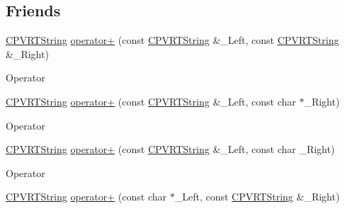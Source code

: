 \subsection*{Friends}
\begin{DoxyCompactItemize}
\item 
\hyperlink{class_c_p_v_r_t_string}{C\+P\+V\+R\+T\+String} \hyperlink{class_c_p_v_r_t_string_a55822216138f6b1754a86f5be8b2d3c1}{operator+} (const \hyperlink{class_c_p_v_r_t_string}{C\+P\+V\+R\+T\+String} \&\+\_\+\+Left, const \hyperlink{class_c_p_v_r_t_string}{C\+P\+V\+R\+T\+String} \&\+\_\+\+Right)
\begin{DoxyCompactList}\small\item\em 
\begin{DoxyItemize}
\item Operator 
\end{DoxyItemize}\end{DoxyCompactList}\item 
\hyperlink{class_c_p_v_r_t_string}{C\+P\+V\+R\+T\+String} \hyperlink{class_c_p_v_r_t_string_a9f4a0eae70b0814e1e7da15f10a793b9}{operator+} (const \hyperlink{class_c_p_v_r_t_string}{C\+P\+V\+R\+T\+String} \&\+\_\+\+Left, const char $\ast$\+\_\+\+Right)
\begin{DoxyCompactList}\small\item\em 
\begin{DoxyItemize}
\item Operator 
\end{DoxyItemize}\end{DoxyCompactList}\item 
\hyperlink{class_c_p_v_r_t_string}{C\+P\+V\+R\+T\+String} \hyperlink{class_c_p_v_r_t_string_abd3296911823f295efe289da8f3ded23}{operator+} (const \hyperlink{class_c_p_v_r_t_string}{C\+P\+V\+R\+T\+String} \&\+\_\+\+Left, const char \+\_\+\+Right)
\begin{DoxyCompactList}\small\item\em 
\begin{DoxyItemize}
\item Operator 
\end{DoxyItemize}\end{DoxyCompactList}\item 
\hyperlink{class_c_p_v_r_t_string}{C\+P\+V\+R\+T\+String} \hyperlink{class_c_p_v_r_t_string_a4ec418661812913ea5de1c1eac277bae}{operator+} (const char $\ast$\+\_\+\+Left, const \hyperlink{class_c_p_v_r_t_string}{C\+P\+V\+R\+T\+String} \&\+\_\+\+Right)
\begin{DoxyCompactList}\small\item\em 

\end{DoxyCompactList}
\end{DoxyCompactItemize}
